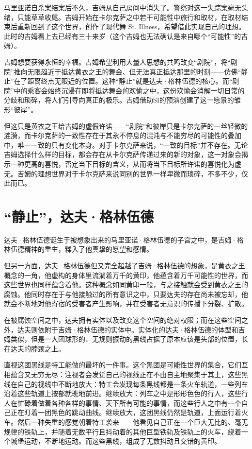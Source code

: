 马里亚诺自杀案结案后不久，吉姆从自己房间中消失了。警察对这一失踪案毫无头绪，只能草草收尾。吉姆开始在卡尔克萨之中若干可能性中旅行和取材，在取材结束后重新回到了这个世界，创作了现代舞 St. Illness，希望借此实现自己的理想。此时的吉姆看上去已经有三十来岁（这个吉姆也无法确认是来自哪个“可能性”的吉姆）。

吉姆想要获得永恒的幸福。吉姆希望利用大量人思想的共鸣改变“剧院”，将“剧院”推向无限趋近于抵达黄衣之王的舞会、但无法真正抵达那里的时刻——仿佛“静止”在了距离终点无限近的位置。这种“静止”就是达夫·格林伍德的核心。而“剧院”中的乘客会始终沉浸在即将抵达舞会的欢愉之中，这份欢愉会消解一切日常的分歧和琐碎，将人们引导向真正的极乐。吉姆借助SI的预演创建了这一愿景的雏形“彼岸”。

但这只是黄衣之王给吉姆的虚假许诺——“剧院”和彼岸只是卡尔克萨的一丝轻微的涟漪，而卡尔克萨的一致性存在于其永不停息的混沌与不能穷尽的可能性的叠加中，唯一一致的只有变化本身。对于卡尔克萨来说，“一致的目标”并不存在。无论吉姆选择什么样的目标，都会存在从卡尔克萨传递过来的新的对象，这一对象会揭示一种更高的喜悦，否定当下目标的含义，从而将当下目标所许诺的喜悦化为虚无。吉姆的理想世界对于卡尔克萨来说同别的世界一样卑微而琐碎，不多不少，仅此而已。

\section{“静止”，达夫·格林伍德}

达夫·格林伍德诞生于被想象出来的马里亚诺·格林伍德的子宫之中，是吉姆·格林伍德精神的重生，糅入了他真挚的愿望和感情。

但另一方面，达夫·格林伍德但又完全超越了吉姆·格林伍德的想象，是黄衣之王概念的一角，他虚构的身体里流淌着万千的黄印，他蕴含着万千可能性的世界，而这些世界也同样蕴含着他。这种概念如同黄印一般，与之接触就会受到黄衣之王的腐蚀。他同时存在于与他接触过的所有意识之中，只要达夫的存在尚未被忘却，他就会不断地对他寄宿的受害者产生影响，并在受害者无意识的传播下分裂、扩散。

在被腐蚀空间之中，达夫拥有实体以及改变这个空间的绝对权限；而在这些空间之外，达夫则依附于吉姆·格林伍德的实体中。实体化的达夫·格林伍德的体型和吉姆类似，但是一大团球形的、无规则振动的黑线占据了原本应该是头部的位置，长在达夫的脖颈之上。

直视这团黑线是特工能做的最坏的一件事。这个黑团是可能性世界的集合，它们互相蕴含又无穷无尽：注视者会发觉自己的视线正在不由自主地聚集于其上，这些黑线在自己的视线中不断地放大：特工会发现每条黑线都是一条火车轨道，一些列车沿着这些轨道上按部就班地前进。继续放大：列车之中是形形色色的行人，这些行人在忙碌着做着各种各样的事情、天下所有可能的事情，而这些行人之中有一个自己正在盯着一团黑色的跳动曲线。继续放大，这团黑线仍然是轨道，上面运行着火车。然后一种失重的感觉朝着特工袭来——他看见自己正在一个巨大无比的、毫无规律的铁轨上，并随着无数平行且抖动着的其他巨型铁轨及铁轨上的火车，绕着一个城堡运动，不断地运动。而这些黑线，组成了无数抖动且交错的黄印。

